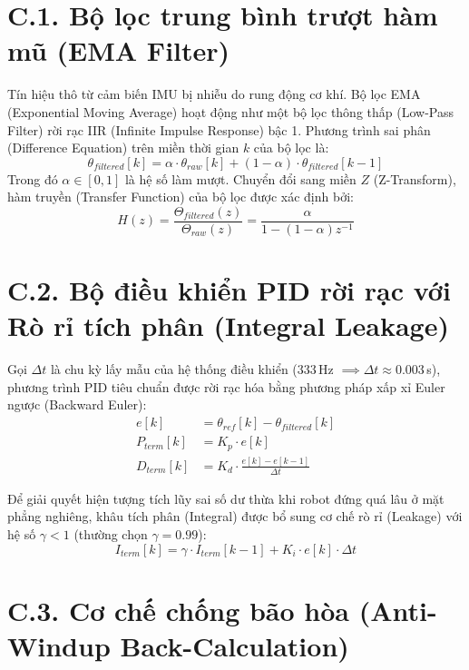 \section*{C.1. Bộ lọc trung bình trượt hàm mũ (EMA Filter)}

Tín hiệu thô từ cảm biến IMU bị nhiễu do rung động cơ khí. Bộ lọc EMA (Exponential Moving Average) hoạt động như một bộ lọc thông thấp (Low-Pass Filter) rời rạc IIR (Infinite Impulse Response) bậc 1. Phương trình sai phân (Difference Equation) trên miền thời gian $k$ của bộ lọc là:
\begin{equation}
\theta_{filtered}[k] = \alpha \cdot \theta_{raw}[k] + (1 - \alpha) \cdot \theta_{filtered}[k-1]
\end{equation}
Trong đó $\alpha \in [0, 1]$ là hệ số làm mượt. Chuyển đổi sang miền $Z$ (Z-Transform), hàm truyền (Transfer Function) của bộ lọc được xác định bởi:
\begin{equation}
H(z) = \frac{\Theta_{filtered}(z)}{\Theta_{raw}(z)} = \frac{\alpha}{1 - (1-\alpha)z^{-1}}
\end{equation}

\section*{C.2. Bộ điều khiển PID rời rạc với Rò rỉ tích phân (Integral Leakage)}

Gọi $\Delta t$ là chu kỳ lấy mẫu của hệ thống điều khiển ($333\,$Hz $\implies \Delta t \approx 0.003\,$s), phương trình PID tiêu chuẩn được rời rạc hóa bằng phương pháp xấp xỉ Euler ngược (Backward Euler):
\begin{align}
e[k] &= \theta_{ref}[k] - \theta_{filtered}[k] \\
P_{term}[k] &= K_p \cdot e[k] \\
D_{term}[k] &= K_d \cdot \frac{e[k] - e[k-1]}{\Delta t}
\end{align}

Để giải quyết hiện tượng tích lũy sai số dư thừa khi robot đứng quá lâu ở mặt phẳng nghiêng, khâu tích phân (Integral) được bổ sung cơ chế rò rỉ (Leakage) với hệ số $\gamma < 1$ (thường chọn $\gamma = 0.99$):
\begin{equation}
I_{term}[k] = \gamma \cdot I_{term}[k-1] + K_i \cdot e[k] \cdot \Delta t
\end{equation}

\section*{C.3. Cơ chế chống bão hòa (Anti-Windup Back-Calculation)}

